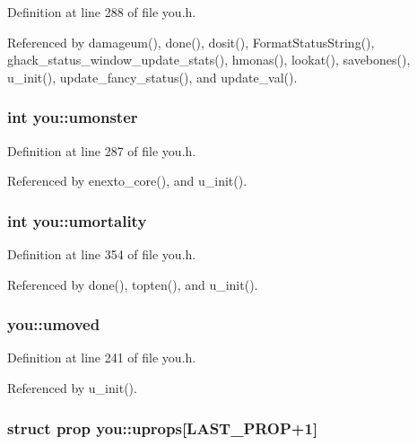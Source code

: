Definition at line 288 of file you.\+h.



Referenced by damageum(), done(), dosit(), Format\+Status\+String(), ghack\+\_\+status\+\_\+window\+\_\+update\+\_\+stats(), hmonas(), lookat(), savebones(), u\+\_\+init(), update\+\_\+fancy\+\_\+status(), and update\+\_\+val().

\hypertarget{structyou_a52b907b7b60827d63d8a2306e3831479}{
\subsubsection[{umonster}]{\setlength{\rightskip}{0pt plus 5cm}int you\+::umonster}}\label{structyou_a52b907b7b60827d63d8a2306e3831479}


Definition at line 287 of file you.\+h.



Referenced by enexto\+\_\+core(), and u\+\_\+init().

\hypertarget{structyou_a2d62ea3354111911f4afc839b0d8621b}{
\subsubsection[{umortality}]{\setlength{\rightskip}{0pt plus 5cm}int you\+::umortality}}\label{structyou_a2d62ea3354111911f4afc839b0d8621b}


Definition at line 354 of file you.\+h.



Referenced by done(), topten(), and u\+\_\+init().

\hypertarget{structyou_a48fcfb29e5f7a798f8f87e1e3a0c5c47}{
\subsubsection[{umoved}]{ you\+::umoved}}\label{structyou_a48fcfb29e5f7a798f8f87e1e3a0c5c47}


Definition at line 241 of file you.\+h.



Referenced by u\+\_\+init().

\hypertarget{structyou_a922add41f13d0ca6d1665b8754964030}{
\subsubsection[{uprops}]{\setlength{\rightskip}{0pt plus 5cm}struct {\bf prop} you\+::uprops\mbox{[}{\bf L\+A\+S\+T\+\_\+\+P\+R\+O\+P}+1\mbox{]}}}\label{structyou_a922add41f13d0ca6d1665b8754964030}


